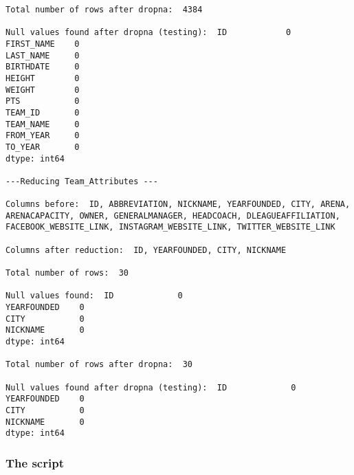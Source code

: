 \documentclass{article}
\begin{document}
\begin{lstlisting}
Total number of rows after dropna:  4384 

Null values found after dropna (testing):  ID            0
FIRST_NAME    0
LAST_NAME     0
BIRTHDATE     0
HEIGHT        0
WEIGHT        0
PTS           0
TEAM_ID       0
TEAM_NAME     0
FROM_YEAR     0
TO_YEAR       0
dtype: int64 

---Reducing Team_Attributes ---

Columns before:  ID, ABBREVIATION, NICKNAME, YEARFOUNDED, CITY, ARENA, ARENACAPACITY, OWNER, GENERALMANAGER, HEADCOACH, DLEAGUEAFFILIATION, FACEBOOK_WEBSITE_LINK, INSTAGRAM_WEBSITE_LINK, TWITTER_WEBSITE_LINK 

Columns after reduction:  ID, YEARFOUNDED, CITY, NICKNAME 

Total number of rows:  30 

Null values found:  ID             0
YEARFOUNDED    0
CITY           0
NICKNAME       0
dtype: int64 

Total number of rows after dropna:  30 

Null values found after dropna (testing):  ID             0
YEARFOUNDED    0
CITY           0
NICKNAME       0
dtype: int64 
\end{lstlisting}

\subsubsection*{The script}
\end{document}
